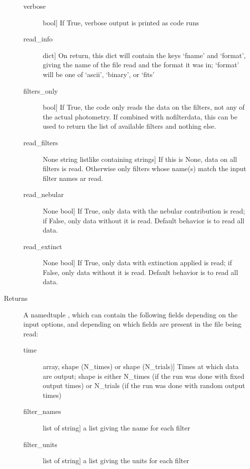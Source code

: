 \documentclass[letterpaper,10pt,english]{sphinxmanual}
\begin{document}
\begin{fulllineitems}
\begin{description}
\begin{description}
\item[{verbose}] \leavevmode{[}bool{]}
If True, verbose output is printed as code runs

\item[{read\_info}] \leavevmode{[}dict{]}
On return, this dict will contain the keys ‘fname’ and
‘format’, giving the name of the file read and the format it
was in; ‘format’ will be one of ‘ascii’, ‘binary’, or ‘fits’

\item[{filters\_only}] \leavevmode{[}bool{]}
If True, the code only reads the data on the filters, not
any of the actual photometry. If combined with nofilterdata,
this can be used to return the list of available filters
and nothing else.

\item[{read\_filters}] \leavevmode{[}None \textbar{} string \textbar{} listlike containing strings{]}
If this is None, data on all filters is read. Otherwise only
filters whose name(s) match the input filter names ar
read.

\item[{read\_nebular}] \leavevmode{[}None \textbar{} bool{]}
If True, only data with the nebular contribution is read; if
False, only data without it is read. Default behavior is to
read all data.

\item[{read\_extinct}] \leavevmode{[}None \textbar{} bool{]}
If True, only data with extinction applied is read; if
False, only data without it is read. Default behavior is to
read all data.

\end{description}

\item[{Returns}] \leavevmode
A namedtuple , which can contain the following fields depending
on the input options, and depending on which fields are present
in the file being read:
\begin{description}
\item[{time}] \leavevmode{[}array, shape (N\_times) or shape (N\_trials){]}
Times at which data are output; shape is either N\_times (if
the run was done with fixed output times) or N\_trials (if
the run was done with random output times)

\item[{filter\_names}] \leavevmode{[}list of string{]}
a list giving the name for each filter

\item[{filter\_units}] \leavevmode{[}list of string{]}
a list giving the units for each filter


\end{description}
\end{description}
\end{fulllineitems}
\end{document}
